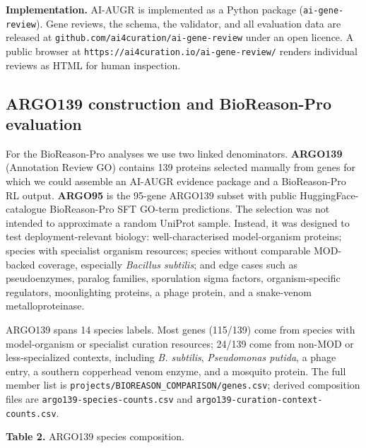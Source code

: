 \documentclass[
  11pt,
]{article}
\begin{document}
\textbf{Implementation.} AI-AUGR is implemented as a Python package
(\texttt{ai-gene-review}). Gene reviews, the schema, the validator, and
all evaluation data are released at
\texttt{github.com/ai4curation/ai-gene-review} under an open licence. A public browser at
\texttt{https://ai4curation.io/ai-gene-review/} renders individual
reviews as HTML for human inspection.

\hypertarget{argo139-construction-and-bioreason-pro-evaluation}{%
\subsection{ARGO139 construction and BioReason-Pro
evaluation}\label{argo139-construction-and-bioreason-pro-evaluation}}

For the BioReason-Pro analyses we use two linked denominators.
\textbf{ARGO139} (Annotation Review GO) contains 139 proteins selected
manually from genes for which we could assemble an AI-AUGR evidence
package and a BioReason-Pro RL output. \textbf{ARGO95} is the 95-gene
ARGO139 subset with public HuggingFace-catalogue BioReason-Pro SFT
GO-term predictions. The selection was not intended to approximate a
random UniProt sample. Instead, it was designed to test
deployment-relevant biology: well-characterised model-organism proteins;
species with specialist organism resources; species without comparable
MOD-backed coverage, especially \emph{Bacillus subtilis}; and edge cases
such as pseudoenzymes, paralog families, sporulation sigma factors,
organism-specific regulators, moonlighting proteins, a phage protein,
and a snake-venom metalloproteinase.

ARGO139 spans 14 species labels. Most genes (115/139) come from species
with model-organism or specialist curation resources; 24/139 come from
non-MOD or less-specialized contexts, including \emph{B. subtilis},
\emph{Pseudomonas putida}, a phage entry, a southern copperhead venom
enzyme, and a mosquito protein. The full member list is
\texttt{projects/BIOREASON\_COMPARISON/genes.csv}; derived composition
files are \texttt{argo139-species-counts.csv} and
\texttt{argo139-curation-context-counts.csv}.

\textbf{Table 2.} ARGO139 species composition.
\end{document}
